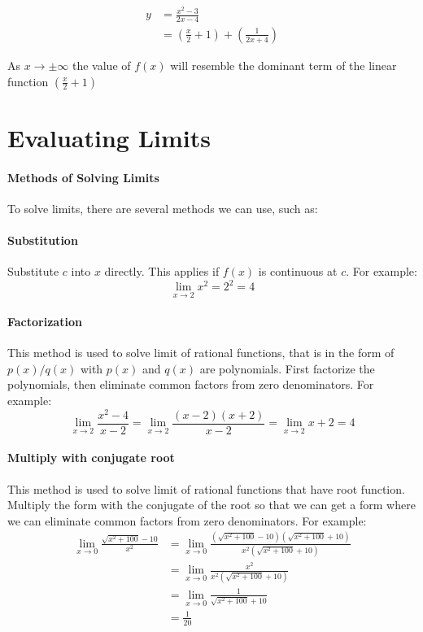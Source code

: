 \documentclass[12pt]{article}
\begin{document}
\begin{align*} 
    y &= \frac{x^2 - 3}{2x - 4} \\
    &= \left(\frac{x}{2} + 1\right) + \left(\frac{1}{2x + 4}\right)
\end{align*}

As $x \to \pm \infty$ the value of $f(x)$ will resemble the dominant term of the linear function $\left(\frac{x}{2} + 1\right)$

\section{Evaluating Limits}
\paragraph{Methods of Solving Limits} To solve limits, there are several methods we can use, such as:
\paragraph{Substitution} Substitute $c$ into $x$ directly. This applies if $f(x)$ is continuous at $c$. For example:
\[
    \lim_{x \to 2} x^2 = 2^2 = 4
\]

\paragraph{Factorization} This method is used to solve limit of rational functions, that is in the form of $p(x)/q(x)$ with
$p(x)$ and $q(x)$ are polynomials. First factorize the polynomials, then eliminate common factors from zero denominators. For example:
\[
    \lim_{x \to 2} \frac{x^2 - 4}{x - 2} =  \lim_{x \to 2} \frac{(x - 2)(x + 2)}{x - 2} = \lim_{x \to 2} x + 2 = 4
\]
\paragraph{Multiply with conjugate root} This method is used to solve limit of rational functions that have root function. 
Multiply the form with the conjugate of the root so that we can get a form where we can eliminate common factors from zero denominators.
For example:
\begin{align*} 
    \lim_{x \to 0} \frac{\sqrt{x^2 + 100} - 10}{x^2} &=  \lim_{x \to 0} \frac{(\sqrt{x^2 + 100} - 10)(\sqrt{x^2 + 100} + 10)}{x^2(\sqrt{x^2 + 100} + 10)} \\
    &= \lim_{x \to 0} \frac{x^2}{x^2(\sqrt{x^2 + 100} + 10)} \\
    &= \lim_{x \to 0} \frac{1}{\sqrt{x^2 + 100} + 10} \\
    &= \frac{1}{20}
\end{align*}
\end{document}
